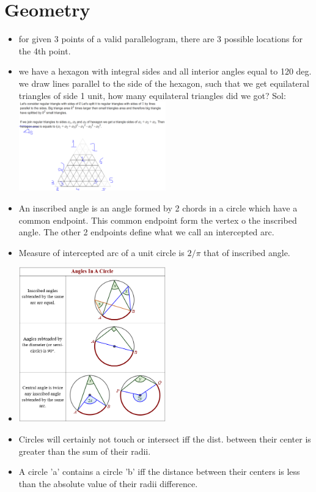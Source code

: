 \documentclass[8pt, a4paper, oneside, twocolumn]{extarticle}
\begin{document}
\section{Geometry}
\begin{itemize}
    \item for given 3 points of a valid parallelogram, there are 3 possible locations for the 4th point.
    \item we have a hexagon with integral sides and all interior angles equal to 120 deg. we draw lines parallel to the side of the hexagon, such that we get equilateral triangles of side 1 unit, how many equilateral triangles did we got? Sol: \includegraphics[width=0.5\textwidth,height=0.5\textheight,keepaspectratio]{triangle} 
    \item An inscribed angle is an angle formed by 2 chords in a circle which have a common endpoint. This common endpoint form the vertex o the inscribed angle. The other 2 endpoints define what we call an intercepted arc.
    \item Measure of intercepted arc of a unit circle is $2/\pi$ that of inscribed angle.
    \item \includegraphics[width=0.5\textwidth,height=0.5\textheight,keepaspectratio]{basiccircle} 
    \item Circles will certainly not touch or intersect iff the dist. between their center is greater than the sum of their radii.
    \item A circle 'a' contains a circle 'b' iff the distance between their centers is less than the absolute value of their radii difference.

\end{itemize}
\end{document}

